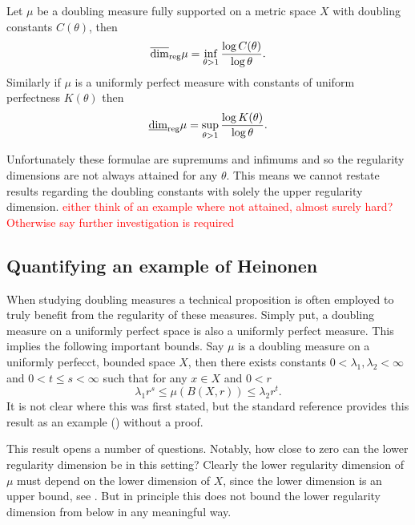 \begin{theorem}\label{ch-quantifying:equivalence}
Let $\mu$ be a doubling measure fully supported on a metric space $X$ with doubling constants $C(\theta)$, then $$\overline{\dim}_{\textup{reg}} \mu = \inf_{\theta > 1}\frac{\log C(\theta)}{\log \theta}.$$ Similarly if $\mu$ is a uniformly perfect measure with constants of uniform perfectness $K(\theta)$ then $$\underline{\dim}_{\textup{reg}} \mu = \sup_{\theta > 1} \frac{\log K(\theta)}{\log \theta}.$$
\end{theorem}


Unfortunately these formulae are supremums and infimums and so the regularity dimensions are not always attained for any $\theta$. This means we cannot restate results regarding the doubling constants with solely the upper regularity dimension. \textcolor{red}{either think of an example where not attained, almost surely hard? Otherwise say further investigation is required}


\subsection{Quantifying an example of Heinonen}


When studying doubling measures a technical proposition is often employed to truly benefit from the regularity of these measures. Simply put, a doubling measure on a uniformly perfect space is also a uniformly perfect measure. This implies the following important bounds. Say $\mu$ is a doubling measure on a uniformly perfecct, bounded space $X$, then there exists constants $0< \lambda_1, \lambda_2 < \infty$ and $0 < t \le s < \infty$ such that for any $x \in X$ and $0 < r$
\[
\lambda_1 r^s \le \mu(B(X,r)) \le \lambda_2 r^t.
\]
It is not clear where this was first stated, but the standard reference \cite{heinonen} provides this result as an example (\cite[Exercise 13.1]{heinonen}) without a proof. 

This result opens a number of questions. Notably, how close to zero can the lower regularity dimension be in this setting? Clearly the lower regularity dimension of $\mu$ must depend on the lower dimension of $X$, since the lower dimension is an upper bound, see \cite{bylund}. But in principle this does not bound the lower regularity dimension from below in any meaningful way. 

